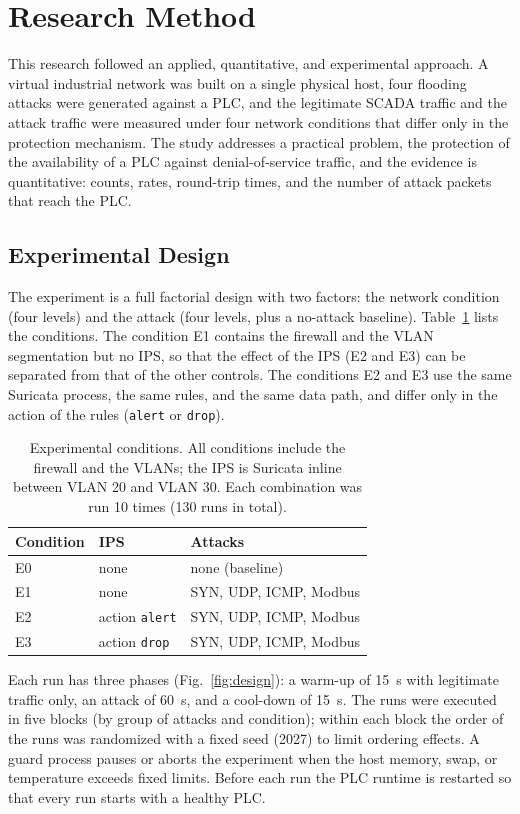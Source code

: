 \section{Research Method}\label{sec:method}
This research followed an applied, quantitative, and experimental approach. A virtual industrial network was built on a single physical host, four flooding attacks were generated against a PLC, and the legitimate SCADA traffic and the attack traffic were measured under four network conditions that differ only in the protection mechanism. The study addresses a practical problem, the protection of the availability of a PLC against denial-of-service traffic, and the evidence is quantitative: counts, rates, round-trip times, and the number of attack packets that reach the PLC.

\subsection{Experimental Design}
The experiment is a full factorial design with two factors: the network condition (four levels) and the attack (four levels, plus a no-attack baseline). Table~\ref{tab:conditions} lists the conditions. The condition E1 contains the firewall and the VLAN segmentation but no IPS, so that the effect of the IPS (E2 and E3) can be separated from that of the other controls. The conditions E2 and E3 use the same Suricata process, the same rules, and the same data path, and differ only in the action of the rules (\texttt{alert} or \texttt{drop}).

\begin{table}[t]
\caption{Experimental conditions. All conditions include the firewall and the VLANs; the IPS is Suricata inline between VLAN 20 and VLAN 30. Each combination was run 10 times (130 runs in total).}\label{tab:conditions}
\centering\footnotesize
\begin{tabular}{lll}
\toprule
Condition & IPS & Attacks\\
\midrule
E0 & none & none (baseline)\\
E1 & none & SYN, UDP, ICMP, Modbus\\
E2 & action \texttt{alert} & SYN, UDP, ICMP, Modbus\\
E3 & action \texttt{drop} & SYN, UDP, ICMP, Modbus\\
\bottomrule
\end{tabular}
\end{table}

Each run has three phases (Fig.~\ref{fig:design}): a warm-up of 15~s with legitimate traffic only, an attack of 60~s, and a cool-down of 15~s. The runs were executed in five blocks (by group of attacks and condition); within each block the order of the runs was randomized with a fixed seed (2027) to limit ordering effects. A guard process pauses or aborts the experiment when the host memory, swap, or temperature exceeds fixed limits. Before each run the PLC runtime is restarted so that every run starts with a healthy PLC.


